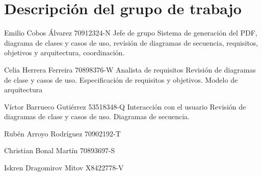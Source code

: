 \section{Descripción del grupo de trabajo}

\staff
{Emilio Cobos Álvarez}
{70912324-N}
{Jefe de grupo}
{Sistema de generación del PDF, diagrama de clases y casos de uso, revisión de diagramas de secuencia, requisitos, objetivos y arquitectura, coordinación.}

\staff
{Celia Herrera Ferreira}
{70898376-W}
{Analista de requisitos}
{Revisión de diagramas de clase y casos de uso. Especificación de requisitos y objetivos. Modelo de arquitectura}

\staff
{Víctor Barrueco Gutiérrez}
{53518348-Q}
{Interacción con el usuario}
{Revisión de diagramas de clase y casos de uso. Diagramas de secuencia.}

\staff
{Rubén Arroyo Rodríguez}
{70902192-T}
{}
{}

\staff
{Christian Bonal Martín}
{70893697-S}
{}
{}

\staff
{Iskren Dragomirov Mitov}
{X8422778-V}
{}
{}

